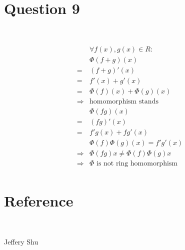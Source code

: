 \documentclass{article}
\begin{document}
\newpage

\section*{Question 9}

~

\begin{align*}
    &\forall f(x),g(x)\in R:\\
    &\Phi(f+g)(x)\\
    =&(f+g)'(x)\\
    =&f'(x)+g'(x)\\
    =&\Phi(f)(x)+\Phi(g)(x)\\
    \Rightarrow&\text{homomorphism stands}\\
    &\Phi(fg)(x)\\
    =&(fg)'(x)\\
    =&f'g(x)+fg'(x)\\
    &\Phi(f)\Phi(g)(x)=f'g'(x)\\
    \Rightarrow&\Phi(fg)x\ne\Phi(f)\Phi(g)x\\
    \Rightarrow&\Phi\text{ is not ring homomorphism}\\
\end{align*}

\newpage

\section*{Reference}

~

Jeffery Shu
\end{document}
